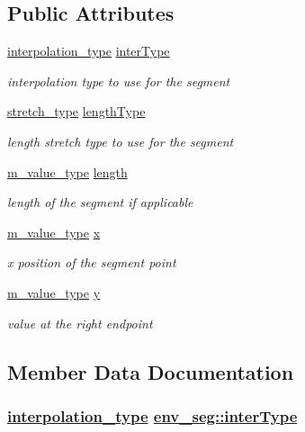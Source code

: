 \subsection*{Public Attributes}
\begin{CompactItemize}
\item 
\hyperlink{Types_8h_a13}{interpolation\_\-type} \hyperlink{structenv__seg_o0}{inter\-Type}
\begin{CompactList}\small\item\em interpolation type to use for the segment \item\end{CompactList}\item 
\hyperlink{Types_8h_a12}{stretch\_\-type} \hyperlink{structenv__seg_o1}{length\-Type}
\begin{CompactList}\small\item\em length stretch type to use for the segment \item\end{CompactList}\item 
\hyperlink{Types_8h_a3}{m\_\-value\_\-type} \hyperlink{structenv__seg_o2}{length}
\begin{CompactList}\small\item\em length of the segment if applicable \item\end{CompactList}\item 
\hyperlink{Types_8h_a3}{m\_\-value\_\-type} \hyperlink{structenv__seg_o3}{x}
\begin{CompactList}\small\item\em x position of the segment point \item\end{CompactList}\item 
\hyperlink{Types_8h_a3}{m\_\-value\_\-type} \hyperlink{structenv__seg_o4}{y}
\begin{CompactList}\small\item\em value at the right endpoint \item\end{CompactList}\end{CompactItemize}


\subsection{Member Data Documentation}
\hypertarget{structenv__seg_o0}{
\subsubsection[interType]{\setlength{\rightskip}{0pt plus 5cm}\hyperlink{Types_8h_a13}{interpolation\_\-type} \hyperlink{structenv__seg_o0}{env\_\-seg::inter\-Type}}}
\label{structenv__seg_o0}


